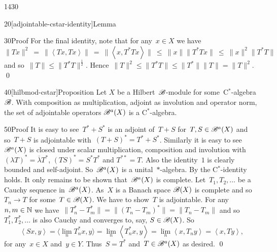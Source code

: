 \begin{parsec}{1430}
\begin{point}{20}[adjointable-cstar-identity]{Lemma}
\begin{point}{30}{Proof}
For the final identity, note that for any~$x \in X$ we have
\begin{equation*}
\|Tx\|^2 \ =\  \|\left<Tx,Tx\right>\| 
            \ =\  \| \left<x, T^*Tx\right>\|
            \ \leq\  \|x \| \|T^*Tx \|
            \ \leq\  \|x\|^2 \|T^*T\|
\end{equation*}
and so~$\|T\| \leq \|T^*T\|^{\frac{1}{2}}$.
Hence~$\|T\|^2 \leq \|T^*T\| \leq \|T^*\|\|T\| = \|T\|^2$.
    \qed
\end{point}
\end{point}
\begin{point}{40}[hilbmod-cstar]{Proposition}%
Let $X$ be a Hilbert~$\mathscr{B}$-module for some~C$^*$-algebra~$\mathscr{B}$.
With composition as multiplication,
    adjoint as involution
    and operator norm,
    the set of adjointable operators
     $\mathscr{B}^a(X)$ is a C$^*$-algebra. \cite[\S2]{paschke}
\begin{point}{50}{Proof}
It is easy to see~$T^*+S^*$ is an adjoint of~$T+S$
    for~$T,S \in \mathscr{B}^a(X)$
    and so~$T+S$ is adjointable with~$(T+S)^* = T^*+ S^*$.
    Similarly it is easy to see~$\mathscr{B}^a(X)$
        is closed under scalar multiplication, composition and involution
        with~$(\lambda T)^* = \overline{\lambda} T^* $,
            $(TS)^* = S^*T^*$ and
            $T^{**} =T$.
Also the identity~$1$ is clearly bounded and self-adjoint.
So~$\mathscr{B}^a(X)$ is a unital~$*$-algebra.
By  
    the C$^*$-identity holds.
It only remains to be shown that~$\mathscr{B}^a(X)$ is complete.
Let~$T_1,T_2,\ldots$ be a Cauchy sequence in~$\mathscr{B}^a(X)$.
As~$X$ is a Banach space $\mathscr{B}(X)$ is complete
    and so~$T_n \to T$ for some~$T \in \mathscr{B}(X)$.
We have to show~$T$ is adjointable.
For any~$n,m \in \mathbb{N}$ we have~$\|T_n^* - T_m^*\|
= \|(T_n - T_m)^*\| = \|T_n - T_m\|$
and so~$T^*_1, T^*_2,\ldots$
is also Cauchy
and converges to, say, $S \in \mathscr{B}(X)$.
So
\begin{equation*}
\left<S x, y\right> =
\langle\lim_{n} T^*_n x, y\rangle = \lim_n \left<T_n^* x, y\right>
                = \lim_n \left<x, T_n y\right>
                =  \left<x, T y\right>,
\end{equation*}
for any~$x \in X$ and~$y \in Y$.
Thus~$S = T^*$ and~$T \in \mathscr{B}^a(X)$ as desired. \qed
\end{point}
\end{point}
\end{parsec}
